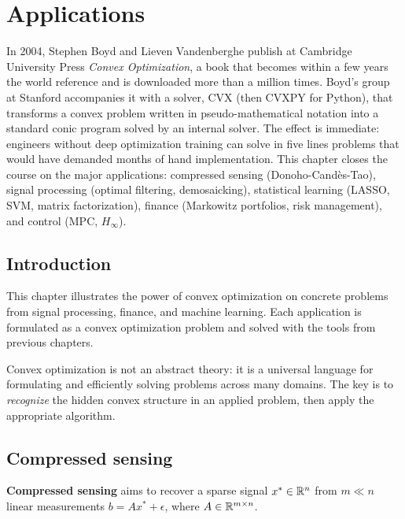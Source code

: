 \chapter{Applications}
\label{ch:applications}

In 2004, Stephen Boyd and Lieven Vandenberghe publish at Cambridge University Press \emph{Convex Optimization}, a book that becomes within a few years the world reference and is downloaded more than a million times. Boyd's group at Stanford accompanies it with a solver, CVX (then CVXPY for Python), that transforms a convex problem written in pseudo-mathematical notation into a standard conic program solved by an internal solver. The effect is immediate: engineers without deep optimization training can solve in five lines problems that would have demanded months of hand implementation. This chapter closes the course on the major applications: compressed sensing (Donoho-Candès-Tao), signal processing (optimal filtering, demosaicking), statistical learning (LASSO, SVM, matrix factorization), finance (Markowitz portfolios, risk management), and control (MPC, $H_\infty$).

\section{Introduction}

This chapter illustrates the power of convex optimization on concrete problems
from signal processing, finance, and machine learning. Each application is
formulated as a convex optimization problem and solved with the tools from
previous chapters.

\begin{intuition}
Convex optimization is not an abstract theory: it is a universal language for
formulating and efficiently solving problems across many domains. The key is to
\emph{recognize} the hidden convex structure in an applied problem, then apply
the appropriate algorithm.
\end{intuition}

\section{Compressed sensing}

\begin{definition}
\textbf{Compressed sensing} aims to recover a sparse signal
$x^* \in \mathbb{R}^n$ from $m \ll n$ linear measurements $b = Ax^* + \epsilon$,
where $A \in \mathbb{R}^{m \times n}$.
\end{definition}

